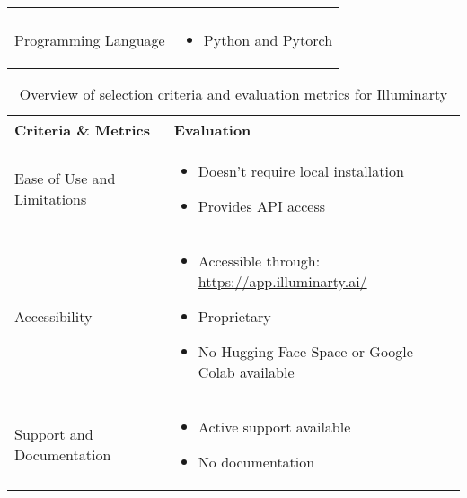 \begin{table}[htpb]
\begin{tabularx}{\textwidth}{l X}
\begin{itemize}
		                               \end{itemize}                    \\
		\addlinespace
		Programming Language         & \begin{itemize}
			                               \item Python and Pytorch
		                               \end{itemize}                                                            \\
		\bottomrule
	\end{tabularx}
\end{table}

\begin{table}[htpb]
	\caption{Overview of selection criteria and evaluation metrics for Illuminarty}\label{tab:illuminarty-overview}
	\centering
	\small
	\begin{tabularx}{\textwidth}{l X}
		\toprule
		\textbf{Criteria \& Metrics} & \textbf{Evaluation}                                        \\
		\midrule
		Ease of Use and Limitations  & \begin{itemize}
			                               \item Doesn't require local installation
			                               \item Provides \ac{API} access
		                               \end{itemize}                    \\
		\addlinespace
		Accessibility                & \begin{itemize}
			                               \item Accessible through: \url{https://app.illuminarty.ai/}
			                               \item Proprietary
			                               \item No Hugging Face Space or Google Colab available
		                               \end{itemize} \\
		\addlinespace
		Support and Documentation    & \begin{itemize}
			                               \item Active support available
			                               \item No documentation
		                               \end{itemize}                              \\

\end{tabularx}
\end{table}
